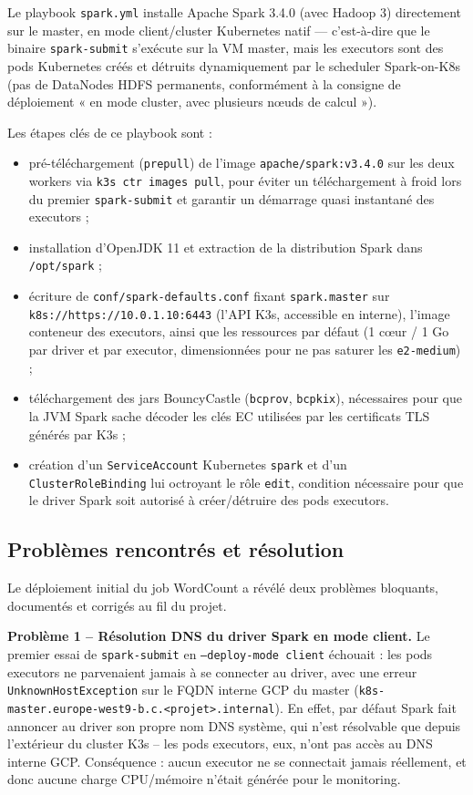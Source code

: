 \documentclass{name}
\begin{document}
Le playbook \texttt{spark.yml} installe Apache Spark 3.4.0 (avec Hadoop 3) directement sur le master, en mode client/cluster Kubernetes natif — c'est-à-dire que le binaire \texttt{spark-submit} s'exécute sur la VM master, mais les executors sont des pods Kubernetes créés et détruits dynamiquement par le scheduler Spark-on-K8s (pas de DataNodes HDFS permanents, conformément à la consigne de déploiement « en mode cluster, avec plusieurs nœuds de calcul »).

Les étapes clés de ce playbook sont :
\begin{itemize}
    \item pré-téléchargement (\texttt{prepull}) de l'image \texttt{apache/spark:v3.4.0} sur les deux workers via \texttt{k3s ctr images pull}, pour éviter un téléchargement à froid lors du premier \texttt{spark-submit} et garantir un démarrage quasi instantané des executors ;
    \item installation d'OpenJDK 11 et extraction de la distribution Spark dans \texttt{/opt/spark} ;
    \item écriture de \texttt{conf/spark-defaults.conf} fixant \texttt{spark.master} sur \texttt{k8s://https://10.0.1.10:6443} (l'API K3s, accessible en interne), l'image conteneur des executors, ainsi que les ressources par défaut (1 cœur / 1 Go par driver et par executor, dimensionnées pour ne pas saturer les \texttt{e2-medium}) ;
    \item téléchargement des jars BouncyCastle (\texttt{bcprov}, \texttt{bcpkix}), nécessaires pour que la JVM Spark sache décoder les clés EC utilisées par les certificats TLS générés par K3s ;
    \item création d'un \texttt{ServiceAccount} Kubernetes \texttt{spark} et d'un \texttt{ClusterRoleBinding} lui octroyant le rôle \texttt{edit}, condition nécessaire pour que le driver Spark soit autorisé à créer/détruire des pods executors.
\end{itemize}

\subsection{Problèmes rencontrés et résolution}
\label{sec:problemes}

Le déploiement initial du job WordCount a révélé deux problèmes bloquants, documentés et corrigés au fil du projet.

\textbf{Problème 1 -- Résolution DNS du driver Spark en mode client.} Le premier essai de \texttt{spark-submit} en \texttt{--deploy-mode client} échouait : les pods executors ne parvenaient jamais à se connecter au driver, avec une erreur \texttt{UnknownHostException} sur le FQDN interne GCP du master (\texttt{k8s-master.europe-west9-b.c.<projet>.internal}). En effet, par défaut Spark fait annoncer au driver son propre nom DNS système, qui n'est résolvable que depuis l'extérieur du cluster K3s -- les pods executors, eux, n'ont pas accès au DNS interne GCP. Conséquence : aucun executor ne se connectait jamais réellement, et donc aucune charge CPU/mémoire n'était générée pour le monitoring.
\end{document}

